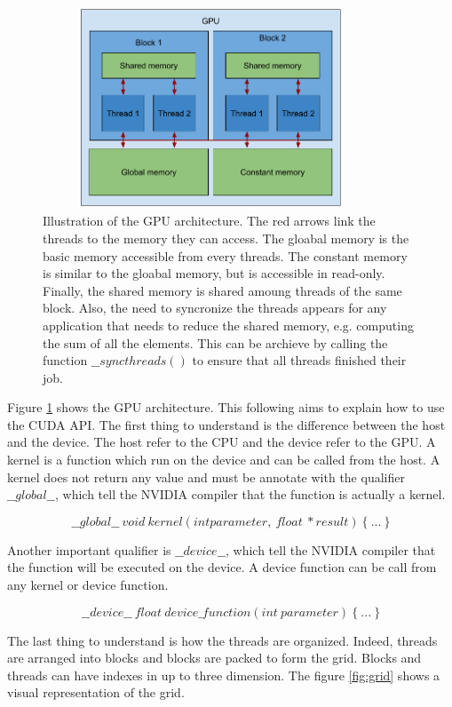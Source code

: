 \documentclass[11pt]{report}
\begin{document}
\begin{figure}[h]
\centering
\includegraphics[width=10cm, height=6cm]{gpu_architecture}
\caption{Illustration of the GPU architecture. The red arrows link the threads to the memory they can access. The gloabal memory is the basic memory accessible from every threads. The constant memory is similar to the gloabal memory, but is accessible in read-only. Finally, the shared memory is shared amoung threads of the same block. Also, the need to syncronize the threads appears for any application that needs to reduce the shared memory, e.g. computing the sum of all the elements. This can be archieve by calling the function $\_\_syncthreads()$ to ensure that all threads finished their job.}
\label{fig:gpu_architecture}
\end{figure}

\noindent Figure \ref{fig:gpu_architecture} shows the GPU architecture. This following aims to explain how to use the CUDA API. The first thing to understand is the difference between the host and the device. The host refer to the CPU and the device refer to the GPU. A kernel is a function which run on the device and can be called from the host. A kernel does not return any value and must be annotate with the qualifier $\_\_global\_\_$, which tell the NVIDIA compiler that the function is actually a kernel.

$$\_\_global\_\_\ void\ kernel(int parameter,\ float\ *result)\ \{\ ...\ \}$$

\noindent Another important qualifier is $\_\_device\_\_$, which tell the NVIDIA compiler that the function will be executed on the device. A device function can be call from any kernel or device function.

$$\_\_device\_\_\ float\ device\_function(int\ parameter)\ \{\ ...\ \}$$

\noindent The last thing to understand is how the threads are organized. Indeed, threads are arranged into blocks and blocks are packed to form the grid. Blocks and threads can have indexes in up to three dimension. The figure \ref{fig:grid} shows a visual representation of the grid.
\end{document}
